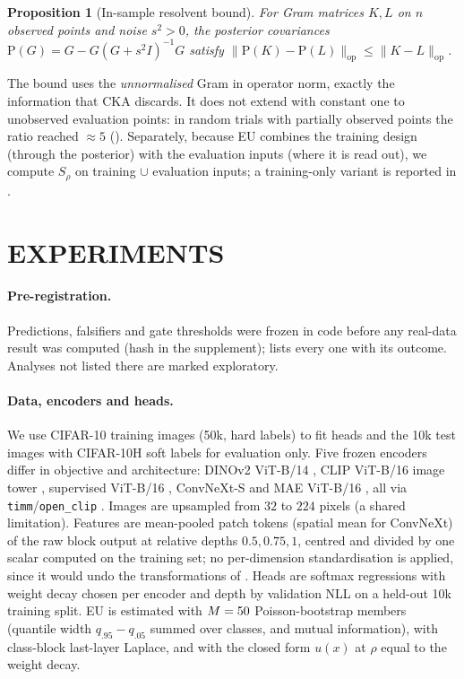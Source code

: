 \documentclass[twoside]{article}
\newtheorem{proposition}[theorem]{Proposition}
\theoremstyle{definition}
\theoremstyle{remark}
\newcommand{\Srho}{S_{\rho}}
\begin{document}
\begin{proposition}[In-sample resolvent bound]
\label{prop:resolvent}
For Gram matrices $K,L$ on $n$ observed points and noise $s^2>0$, the posterior covariances $\mathrm{P}(G)=G-G(G+s^2I)^{-1}G$ satisfy $\|\mathrm P(K)-\mathrm P(L)\|_{\mathrm{op}}\le\|K-L\|_{\mathrm{op}}$.
\end{proposition}
The bound uses the \emph{unnormalised} Gram in operator norm, exactly the information that CKA discards.
It does not extend with constant one to unobserved evaluation points: in random trials with partially observed points the ratio reached $\approx5$ ().
Separately, because EU combines the training design (through the posterior) with the evaluation inputs (where it is read out), we compute $\Srho$ on training $\cup$ evaluation inputs; a training-only variant is reported in .

\section{EXPERIMENTS}
\label{sec:exp}

\paragraph{Pre-registration.}
Predictions, falsifiers and gate thresholds were frozen in code before any real-data result was computed (hash in the supplement);  lists every one with its outcome. Analyses not listed there are marked exploratory.



\paragraph{Data, encoders and heads.}
We use CIFAR-10 \citep{krizhevsky2009cifar} training images (50k, hard labels) to fit heads and the 10k test images with CIFAR-10H soft labels \citep[about 50 annotators per image;][]{peterson2019human} for evaluation only.
Five frozen encoders differ in objective and architecture: DINOv2 ViT-B/14 \citep{oquab2024dinov2}, CLIP ViT-B/16 image tower \citep{radford2021clip,cherti2023openclip}, supervised ViT-B/16 \citep{dosovitskiy2021vit,steiner2022augreg}, ConvNeXt-S \citep{liu2022convnext} and MAE ViT-B/16 \citep{he2022mae}, all via \texttt{timm}/\texttt{open\_clip} \citep{wightman2019timm}.
Images are upsampled from $32$ to $224$ pixels (a shared limitation).
Features are mean-pooled patch tokens (spatial mean for ConvNeXt) of the raw block output at relative depths $0.5,0.75,1$, centred and divided by one scalar computed on the training set; no per-dimension standardisation is applied, since it would undo the transformations of .
Heads are softmax regressions with weight decay chosen per encoder and depth by validation NLL on a held-out 10k training split.
EU is estimated with $M=50$ Poisson-bootstrap members (quantile width $q_{.95}-q_{.05}$ summed over classes, and mutual information), with class-block last-layer Laplace, and with the closed form $u(x)$ at $\rho$ equal to the weight decay.
\end{document}
